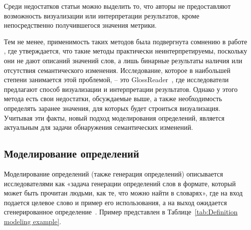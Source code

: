 \documentclass[LI,VKR]{HSEUniversity}
\begin{document}
%

Среди недостатков статьи можно выделить то, что авторы не предоставляют возможность визуализации
или интерпретации результатов, кроме непосредственно получившегося значения метрики.

Тем не менее, применимость таких методов была подвергнута сомнению в работе
\cite{DefinitionGenerationMainArticle},
где
утверждается, что такие методы практически неинтерпретируемы,
поскольку они не дают описаний значений слов,
а лишь бинарные результаты наличия или отсутствия семантического изменения.
Исследование, которое в наибольшей степени занимается этой проблемой, – это GlossReader~\cite{GlossReader},
где исследователи предлагают способ визуализации и интерпретации результатов.
Однако у этого метода есть свои недостатки, обсуждаемые выше, а также
необходимость определять заранее значения, для которых будет строиться визуализация.
Учитывая эти факты, новый подход моделирования определений,
является актуальным для задачи обнаружения семантических изменений.

\subsection{Моделирование определений}

Моделирование определений (также генерация определений) описывается исследователями как
«задача генерации определений слов в формате,
который может быть прочитан людьми, как те, что можно найти в словарях»,
где на вход подается целевое слово и пример его использования, а на выход
ожидается сгенерированное определение~\cite{DefinitionGenerationMainArticle}.
Пример представлен в Таблице~\ref{tab:Definition modeling example}.
\end{document}
